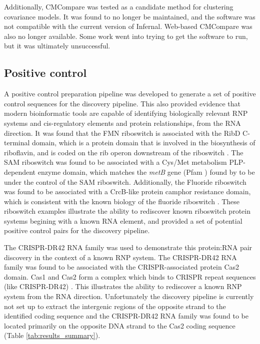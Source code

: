 Additionally, CMCompare \citep{Eggenhofer2013} was tested as a candidate method for clustering covariance models.
It was found to no longer be maintained, and the software was not compatible with the current version of Infernal.
Web-based CMCompare was also no longer available.
Some work went into trying to get the software to run, but it was ultimately unsuccessful.

\subsection{Positive control}

A positive control preparation pipeline was developed to generate a set of positive control sequences for the discovery pipeline.
This also provided evidence that modern bioinformatic tools are capable of identifying biologically relevant \ac{RNP} systems and cis-regulatory elements and protein relationships, from the RNA direction.
It was found that the \ac{FMN} riboswitch is associated with the RibD C-terminal domain, which is a protein domain that is involved in the biosynthesis of riboflavin, and is coded on the rib operon downstream of the riboswitch \citep{Mironov2002}.
The \ac{SAM} riboswitch was found to be associated with a Cys/Met metabolism PLP-dependent enzyme domain, which matches the \emph{metB} gene (Pfam \citep{Paysan-Fafosse2025}) found by \citet{Tang2020} to be under the control of the \ac{SAM} riboswitch.
Additionally, the Fluoride riboswitch was found to be associated with a CrcB-like protein camphor resistance domain, which is consistent with the known biology of the fluoride riboswitch \citep{Baker2012}.
These riboswitch examples illustrate the ability to rediscover known riboswitch protein systems begining with a known RNA element, and provided a set of potential positive control pairs for the discovery pipeline.

The \ac{CRISPR}-DR42 RNA family was used to demonstrate this protein:RNA pair discovery in the context of a known \ac{RNP} system.
The \ac{CRISPR}-DR42 RNA family was found to be associated with the CRISPR-associated protein Cas2 domain.
Cas1 and Cas2 form a complex which binds to \ac{CRISPR} repeat sequences (like \ac{CRISPR}-DR42) \citep{Barrangou2007}.
This illustrates the ability to rediscover a known \ac{RNP} system from the RNA direction.
Unfortunately the discovery pipeline is currently not set up to extract the intergenic regions of the opposite strand to the identified coding sequence and the \ac{CRISPR}-DR42 RNA family was found to be located primarily on the opposite DNA strand to the Cas2 coding sequence (Table \ref{tab:results_summary}).

